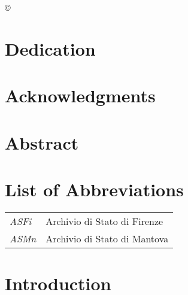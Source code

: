 \documentclass[12pt,letterpaper,oneside,final]{memoir}
\begin{document}
\begin{center} © %


\newpage

\thispagestyle{empty}

\chapter{Dedication}

\DoubleSpacing

\newpage

\chapter{Acknowledgments}
\newpage
\chapter{Abstract}
\DoubleSpacing
\noindent
\setcounter{tocdepth}{2}%
\begin{KeepFromToc}
\tableofcontents
\end{KeepFromToc}
\clearpage
\newpage
\clearpage
\listoffigures
\chapter{List of Abbreviations}
\SingleSpacing
\begin{longtable}{ll}
\emph{ASFi} & Archivio di Stato di Firenze\\
\emph{ASMn} & Archivio di Stato di Mantova\\
\end{longtable}
\clearpage
\listofappendices
\DoubleSpacing
\mainmatter
\clearpage
\cleardoublepage  
{}
\chapter[Introduction]{Introduction}

\chapter{} %


\end{center}
\end{document}
